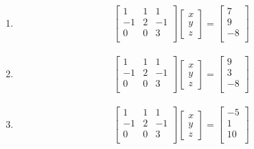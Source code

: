 \documentclass[]{book}
\providecommand{\tightlist}{%
  \setlength{\itemsep}{0pt}\setlength{\parskip}{0pt}}
\theoremstyle{definition}
\theoremstyle{definition}
\theoremstyle{definition}
\theoremstyle{remark}
\begin{document}
\begin{enumerate}
\def\labelenumi{\alph{enumi}.}
\tightlist
\item
  \begin{align*}
  \begin{bmatrix}
  1&1&1\\
  -1&2&-1\\
  0&0&3\\
  \end{bmatrix}
  \begin{bmatrix}
  x \\y \\z
  \end{bmatrix}
  =
  \begin{bmatrix}
  7\\
  9\\
  -8\\
  \end{bmatrix}
  \end{align*}
\item
  \begin{align*}
  \begin{bmatrix}
  1&1&1\\
  -1&2&-1\\
  0&0&3\\
  \end{bmatrix}
  \begin{bmatrix}
  x \\y \\z
  \end{bmatrix}
  =
  \begin{bmatrix}
  9\\
  3\\
  -8\\
  \end{bmatrix}
  \end{align*}
\item
  \begin{align*}
  \begin{bmatrix}
  1&1&1\\
  -1&2&-1\\
  0&0&3\\
  \end{bmatrix}
  \begin{bmatrix}
  x \\y \\z
  \end{bmatrix}
  =
  \begin{bmatrix}
  -5\\
  1\\
  10\\
  \end{bmatrix}
  \end{align*}

\end{enumerate}
\end{document}
